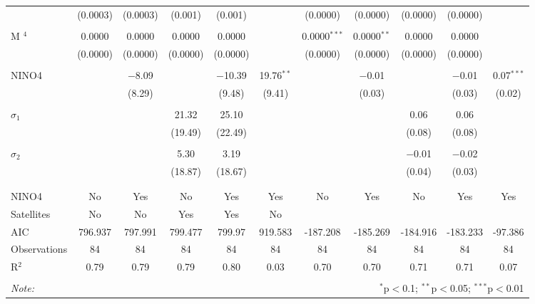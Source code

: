 \begin{table}[H]
\begin{tabular}{@{\extracolsep{0.1pt}}lcccccccccc}
  & (0.0003) & (0.0003) & (0.001) & (0.001) &  & (0.0000) & (0.0000) & (0.0000) & (0.0000) &  \\ 
  & & & & & & & & & & \\ 
 M $^4$ & 0.0000 & 0.0000 & 0.0000 & 0.0000 &  & 0.0000$^{***}$ & 0.0000$^{**}$ & 0.0000 & 0.0000 &  \\ 
  & (0.0000) & (0.0000) & (0.0000) & (0.0000) &  & (0.0000) & (0.0000) & (0.0000) & (0.0000) &  \\ 
  & & & & & & & & & & \\ 
 NINO4 &  & $-$8.09 &  & $-$10.39 & 19.76$^{**}$ &  & $-$0.01 &  & $-$0.01 & 0.07$^{***}$ \\ 
  &  & (8.29) &  & (9.48) & (9.41) &  & (0.03) &  & (0.03) & (0.02) \\ 
  & & & & & & & & & & \\ 
 $\sigma_1$ &  &  & 21.32 & 25.10 &  &  &  & 0.06 & 0.06 &  \\ 
  &  &  & (19.49) & (22.49) &  &  &  & (0.08) & (0.08) &  \\ 
  & & & & & & & & & & \\ 
 $\sigma_2$ &  &  & 5.30 & 3.19 &  &  &  & $-$0.01 & $-$0.02 &  \\ 
  &  &  & (18.87) & (18.67) &  &  &  & (0.04) & (0.03) &  \\ 
  & & & & & & & & & & \\ 
\hline \\[-1.8ex] 
NINO4 & No & Yes & No & Yes & Yes & No & Yes & No & Yes & Yes \\ 
Satellites & No & No & Yes & Yes & No &  &  &  &  &  \\ 
AIC & 796.937 & 797.991 & 799.477 & 799.97 & 919.583 & -187.208 & -185.269 & -184.916 & -183.233 & -97.386 \\ 
Observations & 84 & 84 & 84 & 84 & 84 & 84 & 84 & 84 & 84 & 84 \\ 
R$^{2}$ & 0.79 & 0.79 & 0.79 & 0.80 & 0.03 & 0.70 & 0.70 & 0.71 & 0.71 & 0.07 \\ 
\hline 
\hline \\[-1.8ex] 
\textit{Note:}  & \multicolumn{10}{r}{$^{*}$p$<$0.1; $^{**}$p$<$0.05; $^{***}$p$<$0.01} \\ 
\end{tabular} 
\end{table} 
